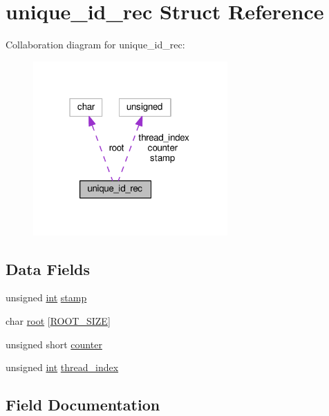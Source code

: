 \hypertarget{structunique__id__rec}{}\section{unique\+\_\+id\+\_\+rec Struct Reference}
\label{structunique__id__rec}


Collaboration diagram for unique\+\_\+id\+\_\+rec\+:
\nopagebreak
\begin{figure}[H]
\begin{center}
\leavevmode
\includegraphics[width=211pt]{structunique__id__rec__coll__graph}
\end{center}
\end{figure}
\subsection*{Data Fields}
\begin{DoxyCompactItemize}
\item 
unsigned \hyperlink{pcre_8txt_a42dfa4ff673c82d8efe7144098fbc198}{int} \hyperlink{structunique__id__rec_a7e7857cbaf065266aa2895b1291e6062}{stamp}
\item 
char \hyperlink{structunique__id__rec_aa755eaf5c4bd3db3b909f0cb51f663ba}{root} \mbox{[}\hyperlink{mod__unique__id_8c_a5814275ccf5d1465a2d3344df26ffe5b}{R\+O\+O\+T\+\_\+\+S\+I\+ZE}\mbox{]}
\item 
unsigned short \hyperlink{structunique__id__rec_a81865096b7bc43a9569dbcc7caf5ab30}{counter}
\item 
unsigned \hyperlink{pcre_8txt_a42dfa4ff673c82d8efe7144098fbc198}{int} \hyperlink{structunique__id__rec_a6704f4f0f55a4316e7c100d4b4262df9}{thread\+\_\+index}
\end{DoxyCompactItemize}


\subsection{Field Documentation}
